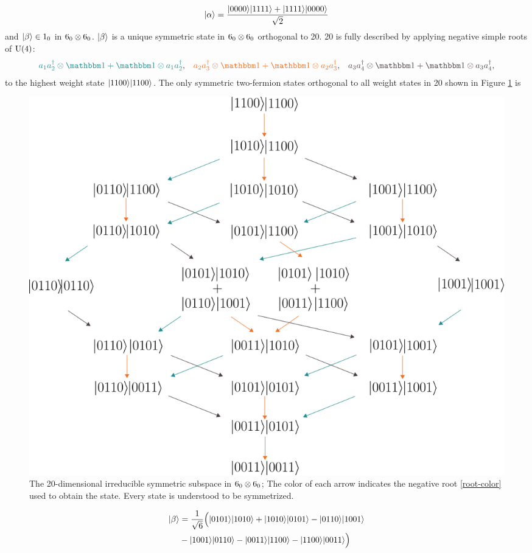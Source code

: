 \begin{align}
{\left\vert{\alpha}\right\rangle} = \frac{{\left\vert{0000}\right\rangle} {\left\vert{1111}\right\rangle} + {\left\vert{1111}\right\rangle} {\left\vert{0000}\right\rangle}}{\sqrt{2}}
\end{align}
and ${\left\vert{\beta}\right\rangle} \in {\text 1_0}$  in ${\text 6_0 \otimes 6_0}$. ${\left\vert{\beta}\right\rangle}$ is a unique symmetric state in ${\text 6_0 \otimes 6_0}$ orthogonal to 20. 20 is fully described by applying negative simple roots of $\text{U}(4)$:
\begin{align}\label{root-color}
	{\onetwo a_1 a\dgg_2 \otimes \id + \id \otimes a_1 a\dgg_2}, &&
	{\twothree a_2 a\dgg_3 \otimes \id + \id \otimes a_2 a\dgg_3}, &&
	{\threefour a_3 a\dgg_4 \otimes \id + \id \otimes a_3 a\dgg_4},
\end{align}
to the highest weight state ${\left\vert{1100}\right\rangle}{\left\vert{1100}\right\rangle}$. The only symmetric two-fermion states orthogonal to all weight states in 20 shown in Figure \ref{fig:hesse-diagram} is
\begin{figure}[t]
	\begin{center}
		\includegraphics[scale=0.525]{img/hasse-diagram.png}
		\caption{The 20-dimensional irreducible symmetric subspace in ${\text 6_0 \otimes 6_0}$; The color of each arrow indicates the negative root \eqref{root-color} used to obtain the state. Every state is understood to be symmetrized.}
		\label{fig:hesse-diagram}
	\end{center}
\end{figure}
\begin{align}
\begin{split}
{\left\vert{\beta}\right\rangle} &= \frac{1}{\sqrt{6}} \Big( {\left\vert{0101}\right\rangle} {\left\vert{1010}\right\rangle}
	+ {\left\vert{1010}\right\rangle} {\left\vert{0101}\right\rangle}
	- {\left\vert{0110}\right\rangle} {\left\vert{1001}\right\rangle} \\
	&- {\left\vert{1001}\right\rangle} {\left\vert{0110}\right\rangle}
	- {\left\vert{0011}\right\rangle} {\left\vert{1100}\right\rangle}
	- {\left\vert{1100}\right\rangle} {\left\vert{0011}\right\rangle} \Big)
\end{split}
\end{align}

